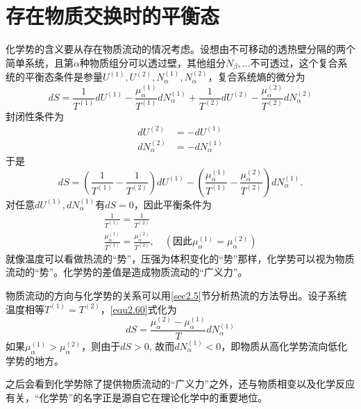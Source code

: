 \section{存在物质交换时的平衡态}
\label{sec2.8}
化学势的含义要从存在物质流动的情况考虑。设想由不可移动的透热壁分隔的两个简单系统，且第$\alpha$种物质组分可以透过壁，其他组分$N_\beta, \dots$不可透过，这个复合系统的平衡态条件是参量$U^{(1)}, U^{(2)}, N_\alpha^{(1)}, N_\alpha^{(2)}$，复合系统熵的微分为
\begin{equation}
	dS = \frac{1}{T^{(1)}} dU^{(1)} - \frac{\mu_\alpha^{(1)}}{T^{(1)}} dN_\alpha^{(1)} + \frac{1}{T^{(2)}} dU^{(2)} - \frac{\mu_\alpha^{(2)}}{T^{(2)}} dN_\alpha^{(2)}
\label{equ2.57}
\end{equation}
封闭性条件为
\begin{align}
	dU^{(2)} &= -dU^{(1)} \label{equ2.58}\\
	dN_\alpha^{(2)} &= - dN_\alpha^{(1)}
\label{equ2.59}
\end{align}
于是
\begin{equation}
	dS = \left( \frac{1}{T^{(1)}} - \frac{1}{T^{(2)}} \right) dU^{(1)} - \left( \frac{\mu_\alpha^{(1)}}{T^{(1)}} - \frac{\mu_\alpha^{(2)}}{T^{(2)}} \right) dN_\alpha^{(1)}.
\label{equ2.60}
\end{equation}
对任意$dU^{(1)}, dN_\alpha^{(1)}$有$dS = 0$，因此平衡条件为
\begin{align}
	\frac{1}{T^{(1)}} = \frac{1}{T^{(2)}} 
\label{equ2.61} \\
	\frac{\mu_\alpha^{(1)}}{T^{(1)}} = \frac{\mu_\alpha^{(2)}}{T^{(2)}}, \quad (\text{因此} \mu_\alpha^{(1)} = \mu_\alpha^{(2)})
\label{equ2.62}
\end{align}
就像温度可以看做热流的“势”，压强为体积变化的“势”那样，化学势可以视为物质流动的“势”。化学势的差值是造成物质流动的“广义力”。

物质流动的方向与化学势的关系可以用\ref{sec2.5}节分析热流的方法导出。设子系统温度相等$T^{(1)} = T^{(2)}$，\eqref{equ2.60}式化为
\begin{equation}
	dS = \frac{\mu_\alpha^{(2)} - \mu_\alpha^{(1)}}{T} dN_\alpha^{(1)}
\label{equ2.63}
\end{equation}
如果$\mu_\alpha^{(1)} > \mu_\alpha^{(2)}$，则由于$dS > 0$, 故而$dN_\alpha^{(1)}< 0$，即物质从高化学势流向低化学势的地方。

之后会看到化学势除了提供物质流动的“广义力”之外，还与物质相变以及化学反应有关，“化学势”的名字正是源自它在理论化学中的重要地位。

